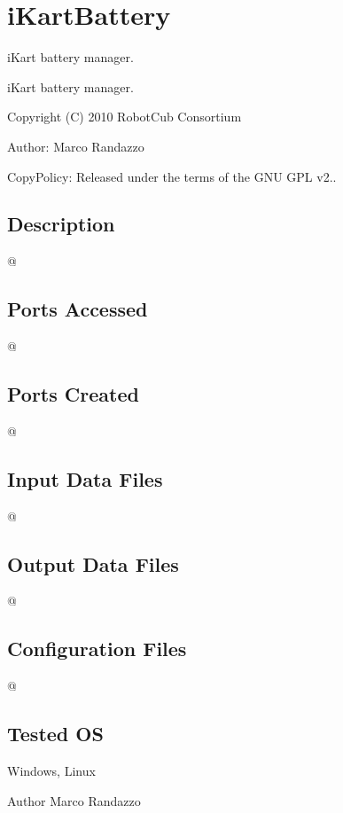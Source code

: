 \section{i\+Kart\+Battery}
\label{group__iKartBattery}


i\+Kart battery manager.  


i\+Kart battery manager. 

Copyright (C) 2010 Robot\+Cub Consortium

Author\+: Marco Randazzo

Copy\+Policy\+: Released under the terms of the G\+N\+U G\+P\+L v2..\hypertarget{group__laserScannerGui_intro_sec}{}\subsection{Description}\label{group__laserScannerGui_intro_sec}
@\hypertarget{group__laserScannerGui_portsa_sec}{}\subsection{Ports Accessed}\label{group__laserScannerGui_portsa_sec}
@\hypertarget{group__laserScannerGui_portsc_sec}{}\subsection{Ports Created}\label{group__laserScannerGui_portsc_sec}
@\hypertarget{group__laserScannerGui_in_files_sec}{}\subsection{Input Data Files}\label{group__laserScannerGui_in_files_sec}
@\hypertarget{group__laserScannerGui_out_data_sec}{}\subsection{Output Data Files}\label{group__laserScannerGui_out_data_sec}
@\hypertarget{group__laserScannerGui_conf_file_sec}{}\subsection{Configuration Files}\label{group__laserScannerGui_conf_file_sec}
@\hypertarget{group__laserScannerGui_tested_os_sec}{}\subsection{Tested O\+S}\label{group__laserScannerGui_tested_os_sec}
Windows, Linux

\begin{DoxyAuthor}{Author}
Marco Randazzo 
\end{DoxyAuthor}
